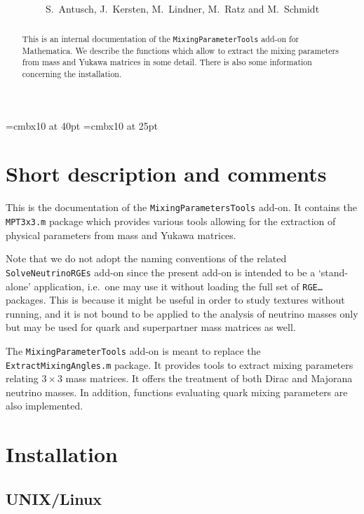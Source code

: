 \documentclass[12pt,a4paper,twoside]{scrartcl}
\newcommand{\package}[1]{{\tt #1}}
\numberwithin{equation}{section}
\numberwithin{table}{section}
\begin{document}
\font\TitleFont=cmbx10 at 40pt
\font\SubTitleFont=cmbx10 at 25pt
\title{\\[1cm]
        }
\author{S.~Antusch, J.~Kersten, M.~Lindner, M.~Ratz and M.~Schmidt}
\maketitle
\begin{abstract}
 This is an internal documentation of the \package{MixingParameterTools} add-on
 for Mathematica. We describe the functions which allow to extract the mixing
 parameters from mass and Yukawa matrices in some detail. There is also some
 information concerning the installation.
\end{abstract}
\thispagestyle{empty}
\tableofcontents
\clearpage


\section{Short description and comments}

This is the documentation of the \package{MixingParametersTools} add-on. It
contains the \package{MPT3x3.m} package which provides various tools allowing
for the extraction of physical parameters from mass and Yukawa matrices.

Note that we do not adopt the naming conventions of the related
\package{SolveNeutrinoRGEs} add-on since the present add-on is intended to be a
`stand-alone' application, i.e.\ one may use it without loading the full set of
\package{RGE\dots} packages. This is because it might be useful in order to
study textures without running, and it is not bound to be applied to the
analysis of neutrino masses only but may be used for quark and superpartner
mass matrices as well.

The \package{MixingParameterTools} add-on is meant to replace the
\package{ExtractMixingAngles.m} package. It provides tools to extract mixing
parameters relating $3\times3$ mass matrices. It offers the treatment of both
Dirac and Majorana neutrino masses. In addition, functions evaluating quark
mixing parameters are also implemented.

\section{Installation}

\subsection{UNIX/Linux}
\end{document}
